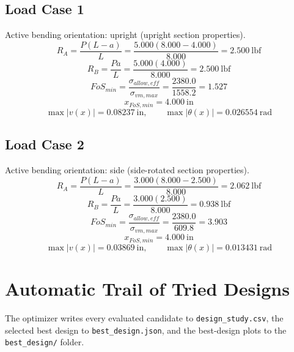 \documentclass[11pt]{article}
\begin{document}
\subsection*{Load Case 1}
Active bending orientation: upright (upright section properties).
\[R_A = \frac{P(L-a)}{L} = \frac{5.000(8.000-4.000)}{8.000} = 2.500\ \mathrm{lbf}\]
\[R_B = \frac{Pa}{L} = \frac{5.000(4.000)}{8.000} = 2.500\ \mathrm{lbf}\]
\[FoS_{min} = \frac{\sigma_{allow,eff}}{\sigma_{vm,max}} = \frac{2380.0}{1558.2} = 1.527\]
\[x_{FoS,min} = 4.000\ \mathrm{in}\]
\[\max |v(x)| = 0.08237\ \mathrm{in}, \qquad \max |\theta(x)| = 0.026554\ \mathrm{rad}\]
\subsection*{Load Case 2}
Active bending orientation: side (side-rotated section properties).
\[R_A = \frac{P(L-a)}{L} = \frac{3.000(8.000-2.500)}{8.000} = 2.062\ \mathrm{lbf}\]
\[R_B = \frac{Pa}{L} = \frac{3.000(2.500)}{8.000} = 0.938\ \mathrm{lbf}\]
\[FoS_{min} = \frac{\sigma_{allow,eff}}{\sigma_{vm,max}} = \frac{2380.0}{609.8} = 3.903\]
\[x_{FoS,min} = 4.000\ \mathrm{in}\]
\[\max |v(x)| = 0.03869\ \mathrm{in}, \qquad \max |\theta(x)| = 0.013431\ \mathrm{rad}\]

\section*{Automatic Trail of Tried Designs}
The optimizer writes every evaluated candidate to \texttt{design\_study.csv}, the selected best design to \texttt{best\_design.json}, and the best-design plots to the \texttt{best\_design/} folder.
\end{document}
